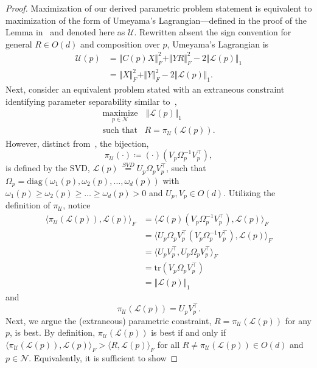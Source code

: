 \documentclass[pdflatex,iicol]{sn-jnl}%
\theoremstyle{thmstyleone}%
\theoremstyle{thmstyletwo}%
\theoremstyle{thmstylethree}%
\begin{document}
\begin{proof}
    Maximization of our derived parametric problem statement is equivalent to maximization of the form of Umeyama's Lagrangian---defined in the proof of the Lemma in~\cite{umeyama1991leastsquares} and denoted here as $\mathcal{U}$. Rewritten absent the sign convention for general $R\in O(d)$ and composition over $p$, Umeyama's Lagrangian is
    \begin{align}
        \mathcal{U}(p) &= \Vert C(p)X\Vert^2_F + \Vert YR\Vert^2_F - 2\Vert \mathcal{L}(p)\Vert_1 \\
        &= \Vert X\Vert^2_F + \Vert Y\Vert^2_F - 2\Vert \mathcal{L}(p)\Vert_1.\nonumber
    \end{align}
    Next, consider an equivalent problem stated with an extraneous constraint identifying parameter separability similar to~\cite{golub1973differentiation},
    $$
    \begin{matrix}   
    \underset{p \in \mathcal{N}}{\text{maximize}} & \,\Vert \mathcal{L}(p)\Vert_1\\
    \text{such that} & R = \pi_{\mathcal{U}}(\mathcal{L}(p)).
    \end{matrix}
    $$
    However, distinct from~\cite{golub1973differentiation}, the bijection, $$\pi_{\mathcal{U}}(\cdot) \coloneqq (\cdot)(V_p\Omega_p^{-1}V_p^{\top}),$$ is defined by the SVD, $\mathcal{L}(p) \,\overset{SVD}{=} U_p\Omega_pV_p^{\top}$, such that $\Omega_p = \text{diag}(\omega_1(p),\omega_2(p),\dots,\omega_d(p))$ with $\omega_1(p) \geq \omega_2(p)\geq \dots \geq \omega_d(p)>0$ and $U_p,V_p \in O(d)$. Utilizing the definition of $\pi_{\mathcal{U}}$, notice
    \begin{align*}
        \langle \pi_{\mathcal{U}}(\mathcal{L}(p)), \mathcal{L}(p)\rangle_F &= \langle \mathcal{L}(p) (V_p\Omega_p^{-1}V_p^{\top}), \mathcal{L}(p) \rangle_F\\
        & = \langle U_p\Omega_pV_p^{\top}(V_p\Omega_p^{-1}V_p^{\top}), \mathcal{L}(p) \rangle_F\\
        & = \langle U_pV_p^{\top}, U_p\Omega_pV_p^{\top} \rangle_F\\
        & = \text{tr}(V_p\Omega_pV_p^{\top})\\
        &= \Vert \mathcal{L}(p) \Vert_1 \quad \tag{$\star$}
    \end{align*}
    and 
    \[
        \pi_{\mathcal{U}}(\mathcal{L}(p)) = U_pV_p^{\top}.    \tag{$\star\star$}
    \]
    Next, we argue the (extraneous) parametric constraint, $R = \pi_{\mathcal{U}}(\mathcal{L}(p))$ for any $p$, is best. By definition, $\pi_{\mathcal{U}}(\mathcal{L}(p))$ is best if and only if $\langle \pi_{\mathcal{U}}(\mathcal{L}(p)),\mathcal{L}(p)\rangle_F > \langle R ,\mathcal{L}(p)\rangle_F$ for all $R \neq \pi_{\mathcal{U}}(\mathcal{L}(p)) \in O(d)$ and $p \in \mathcal{N}$. Equivalently, it is sufficient to show 

\end{proof}
\end{document}
